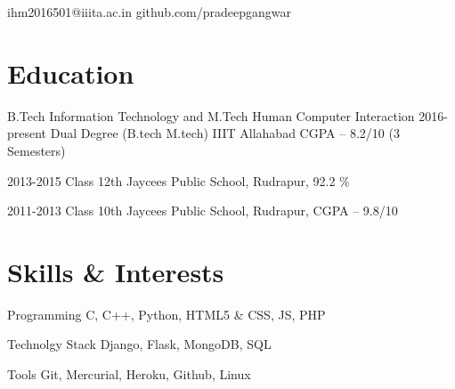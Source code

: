 \documentclass{tccv}
\begin{document}
    {ihm2016501@iiita.ac.in}
    {github.com/pradeepgangwar}

\section{Education}

\begin{yearlist}

\item[B.Tech Information Technology and M.Tech Human Computer Interaction]{2016-present}
     {Dual Degree (B.tech M.tech)}
     {\large{IIIT Allahabad} \newline CGPA -- 8.2/10 (3 Semesters)}

\item{2013-2015}
     {Class 12th}
     {Jaycees Public School, Rudrapur, 92.2 \%}

\item{2011-2013}
     {Class 10th}
     {Jaycees Public School, Rudrapur, CGPA -- 9.8/10}

\end{yearlist}








\section{Skills \& Interests}

\begin{factlist}

\item{Programming}
     {C, C++, Python, HTML5 \& CSS, JS, PHP}

\item{Technolgy Stack}
	{Django, Flask, MongoDB, SQL}

\item{Tools}
     {Git, Mercurial, Heroku, Github, Linux}
     
     
\end{factlist}
\end{document}
